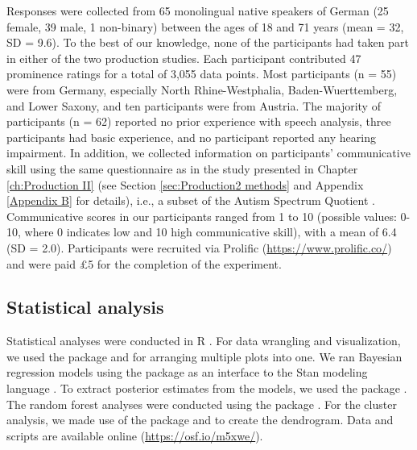 Responses were collected from 65 monolingual native speakers of German (25 female, 39 male, 1 non-binary) between the ages of 18 and 71 years (mean = 32, SD = 9.6). To the best of our knowledge, none of the participants had taken part in either of the two production studies. Each participant contributed 47 prominence ratings for a total of 3,055 data points. Most participants (n = 55) were from Germany, especially North Rhine-Westphalia, Baden-Wuerttemberg, and Lower Saxony, and ten participants were from Austria. The majority of participants (n = 62) reported no prior experience with speech analysis, three participants had basic experience, and no participant reported any hearing impairment. In addition, we collected information on participants' communicative skill using the same questionnaire as in the study presented in Chapter \ref{ch:Production II} (see Section \ref{sec:Production2 methods} and Appendix \ref{Appendix B} for details), i.e., a subset of the Autism Spectrum Quotient \citep{baron-cohenAutismSpectrumQuotientAQ2006}. Communicative scores in our participants ranged from 1 to 10 (possible values: 0-10, where 0 indicates low and 10 high communicative skill), with a mean of 6.4 (SD = 2.0). Participants were recruited via Prolific (\url{https://www.prolific.co/}) and were paid \pounds 5 for the completion of the experiment. 


\subsection{Statistical analysis}

Statistical analyses were conducted in R \citep{rcoreteamLanguageEnvironmentStatistical2022}. For data wrangling and visualization, we used the  package \citep{wickhamWelcomeTidyverse2019} and  \citep{wilkeCowplotStreamlinedPlot2020} for arranging multiple plots into one. We ran Bayesian regression models using the  package \citep{burknerBrmsPackageBayesian2017} as an interface to the Stan modeling language \citep{carpenterStanProbabilisticProgramming2017}. To extract posterior estimates from the models, we used the  package \citep{kayTidybayesTidyData2023}. The random forest analyses were conducted using the  package \citep{hothornUnbiasedRecursivePartitioning2006}. For the cluster analysis, we made use of the  package \citep{maechlerClusterClusterAnalysis2022} and  \citep{devriesGgdendroCreateDendrograms2024} to create the dendrogram.
Data and scripts are available online (\url{https://osf.io/m5xwe/}).


